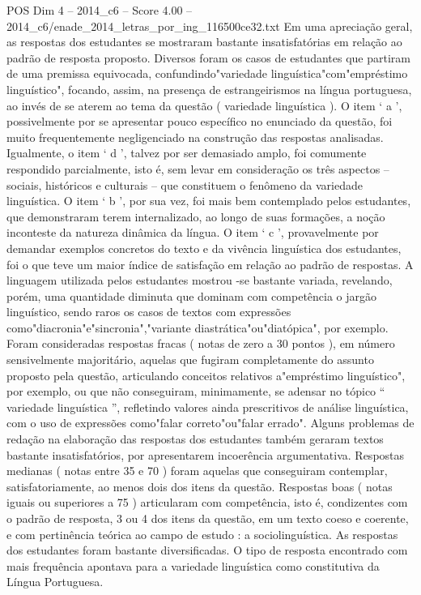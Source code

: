 \begin{textsample}{POS Dim 4 – 2014\_c6 – Score 4.00 – 2014\_c6/enade\_2014\_letras\_por\_ing\_116500ce32.txt}
Em uma apreciação geral, as respostas dos estudantes se mostraram bastante insatisfatórias em relação ao padrão de resposta proposto.
Diversos foram os casos de estudantes que partiram de uma premissa equivocada, confundindo"variedade linguística"com"empréstimo linguístico", focando, assim, na presença de estrangeirismos na língua portuguesa, ao invés de se aterem ao tema da questão ( variedade linguística ).
O item ‘ a ’, possivelmente por se apresentar pouco específico no enunciado da questão, foi muito frequentemente negligenciado na construção das respostas analisadas.
Igualmente, o item ‘ d ’, talvez por ser demasiado amplo, foi comumente respondido parcialmente, isto é, sem levar em consideração os três aspectos – sociais, históricos e culturais – que constituem o fenômeno da variedade linguística.
O item ‘ b ’, por sua vez, foi mais bem contemplado pelos estudantes, que demonstraram terem internalizado, ao longo de suas formações, a noção inconteste da natureza dinâmica da língua.
O item ‘ c ’, provavelmente por demandar exemplos concretos do texto e da vivência linguística dos estudantes, foi o que teve um maior índice de satisfação em relação ao padrão de respostas.
A linguagem utilizada pelos estudantes mostrou -se bastante variada, revelando, porém, uma quantidade diminuta que dominam com competência o jargão linguístico, sendo raros os casos de textos com expressões como"diacronia"e"sincronia","variante diastrática"ou"diatópica", por exemplo.
Foram consideradas respostas fracas ( notas de zero a 30 pontos ), em número sensivelmente majoritário, aquelas que fugiram completamente do assunto proposto pela questão, articulando conceitos relativos a"empréstimo linguístico", por exemplo, ou que não conseguiram, minimamente, se adensar no tópico “ variedade linguística ”, refletindo valores ainda prescritivos de análise linguística, com o uso de expressões como"falar correto"ou"falar errado".
Alguns problemas de redação na elaboração das respostas dos estudantes também geraram textos bastante insatisfatórios, por apresentarem incoerência argumentativa.
Respostas medianas ( notas entre 35 e 70 ) foram aquelas que conseguiram contemplar, satisfatoriamente, ao menos dois dos itens da questão.
Respostas boas ( notas iguais ou superiores a 75 ) articularam com competência, isto é, condizentes com o padrão de resposta, 3 ou 4 dos itens da questão, em um texto coeso e coerente, e com pertinência teórica ao campo de estudo : a sociolinguística.
As respostas dos estudantes foram bastante diversificadas.
O tipo de resposta encontrado com mais frequência apontava para a variedade linguística como constitutiva da Língua Portuguesa.

\end{textsample}
